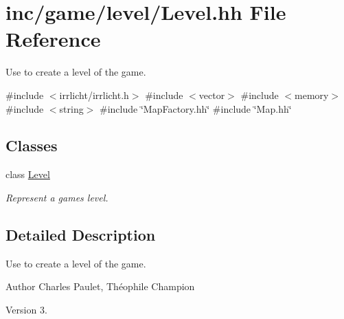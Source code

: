 \hypertarget{Level_8hh}{}\section{inc/game/level/\+Level.hh File Reference}
\label{Level_8hh}


Use to create a level of the game.  


{\ttfamily \#include $<$irrlicht/irrlicht.\+h$>$}\newline
{\ttfamily \#include $<$vector$>$}\newline
{\ttfamily \#include $<$memory$>$}\newline
{\ttfamily \#include $<$string$>$}\newline
{\ttfamily \#include \char`\"{}Map\+Factory.\+hh\char`\"{}}\newline
{\ttfamily \#include \char`\"{}Map.\+hh\char`\"{}}\newline
\subsection*{Classes}
\begin{DoxyCompactItemize}
\item 
class \hyperlink{classLevel}{Level}
\begin{DoxyCompactList}\small\item\em Represent a game\textquotesingle{}s level. \end{DoxyCompactList}\end{DoxyCompactItemize}


\subsection{Detailed Description}
Use to create a level of the game. 

\begin{DoxyAuthor}{Author}
Charles Paulet, Théophile Champion 
\end{DoxyAuthor}
\begin{DoxyVersion}{Version}
3. 
\end{DoxyVersion}
